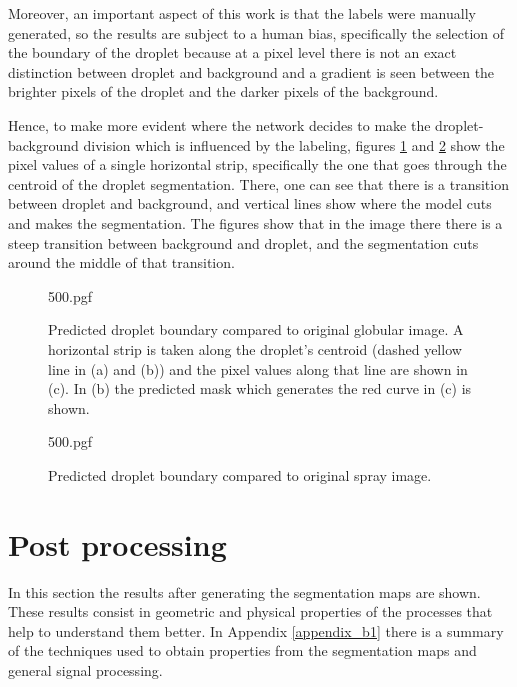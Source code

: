 Moreover, an important aspect of this work is that the labels were manually generated, so the results are subject to a human bias, specifically the selection of the boundary of the droplet because at a pixel level there is not an exact distinction between droplet and background and a gradient is seen between the brighter pixels of the droplet and the darker pixels of the background.

Hence, to make more evident where the network decides to make  the droplet-background division which is influenced by the labeling, figures \ref{fig:boundary_globular} and \ref{fig:boundary_spray} show the pixel values of a single horizontal strip, specifically the one that goes through the centroid of the droplet segmentation. There, one can see that there is a transition between droplet and background, and vertical lines show where the model cuts and makes the segmentation. The figures show that in the image there there is a steep transition between background and droplet, and the segmentation cuts around the middle of that transition.


\begin{figure}
    \centering
    {500.pgf}
    \caption[Predicted droplet boundary compared to original globular image]{Predicted droplet boundary compared to original globular image. A horizontal strip is taken along the droplet's centroid (dashed yellow line in (a) and (b)) and the pixel values along that line are shown in (c). In (b) the predicted mask which generates the red curve in (c) is shown.}
    \label{fig:boundary_globular}
\end{figure}

\begin{figure}
    \centering
    {500.pgf}
    \caption[Predicted droplet boundary compared to original spray image]{Predicted droplet boundary compared to original spray image.}
    \label{fig:boundary_spray}
\end{figure}

\clearpage

\section{Post processing}
In this section the results after generating the segmentation maps are shown. These results consist in geometric and physical properties of the processes that help to understand them better. In Appendix \ref{appendix_b1} there is a summary of the techniques used to obtain properties from the segmentation maps and general signal processing.

